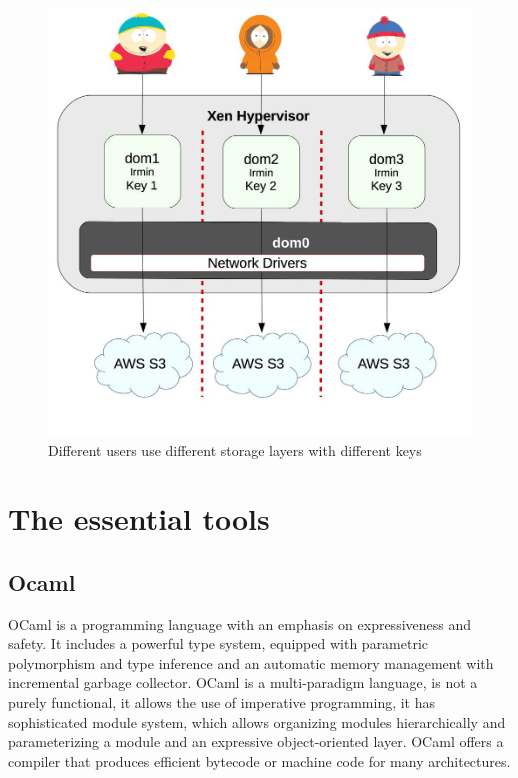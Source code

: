 \documentclass[10pt,a4paper]{report}
\begin{document}
\begin{figure}[H]
\centerline{\includegraphics[scale=0.4]{img/Irmin-MirageOS-separate-user.jpg}}
\caption{Different users use different storage layers with different keys}
\end{figure}

\chapter{The essential tools}

\section{Ocaml}
OCaml is a programming language with an emphasis on expressiveness and safety. 
It includes a powerful type system, equipped with parametric polymorphism and type inference and an automatic memory management with incremental garbage collector. 
OCaml is a multi-paradigm language, is not a purely functional, it allows the use of imperative programming, it has sophisticated module system, which allows organizing modules hierarchically and parameterizing  a module and an expressive object-oriented layer. OCaml offers a compiler that produces efficient bytecode or machine code for many architectures. \newline \cite{ocaml}
\end{document}
